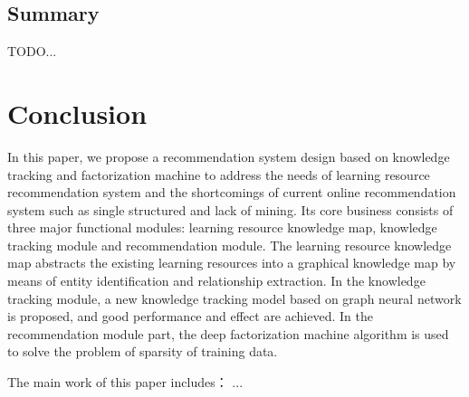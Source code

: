 \documentclass[11pt,en]{elegantpaper}
\begin{document}
\subsection{Summary}
TODO...

\clearpage
\section{Conclusion}
In this paper, we propose a recommendation system design based on knowledge tracking and factorization machine to address the needs of learning resource recommendation system and the shortcomings of current online recommendation system such as single structured and lack of mining. Its core business consists of three major functional modules: learning resource knowledge map, knowledge tracking module and recommendation module. The learning resource knowledge map abstracts the existing learning resources into a graphical knowledge map by means of entity identification and relationship extraction. In the knowledge tracking module, a new knowledge tracking model based on graph neural network is proposed, and good performance and effect are achieved. In the recommendation module part, the deep factorization machine algorithm is used to solve the problem of sparsity of training data.

The main work of this paper includes：
...



\clearpage


\appendix
\addappheadtotoc
\end{document}
